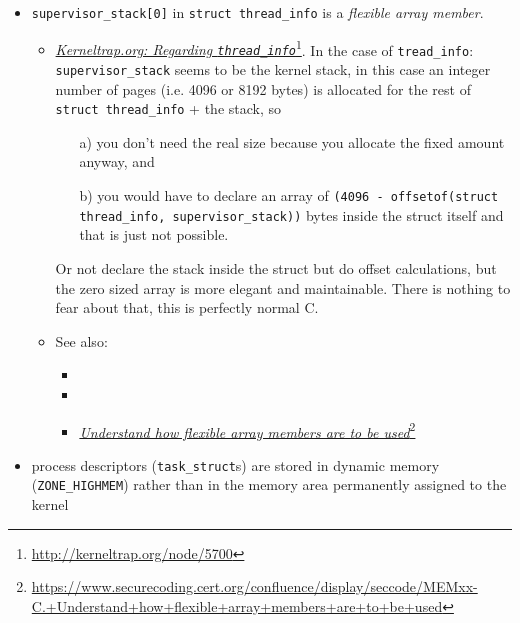 \begin{itemize}
\begin{description}
    kernel stack is either 4 or 8KB, and either way a 1.7KB is pretty much, so storing a
    slimmer struct, that points to \texttt{task\_struct}, immediately saves a lot of stack
    space and is a scalable solution.
  \end{description}
\item \texttt{supervisor\_stack[0]} in \texttt{struct thread\_info} is a \emph{flexible array
    member}.
  \begin{itemize}
  \item \href{http://kerneltrap.org/node/5700}{\emph{Kerneltrap.org: Regarding
      \texttt{thread\_info}}}\footnote{\url{http://kerneltrap.org/node/5700}}. In the case of \texttt{tread\_info}:
    \texttt{supervisor\_stack} seems to be the kernel stack, in this case an integer number
    of pages (i.e. 4096 or 8192 bytes) is allocated for the rest of \texttt{struct
      thread\_info} + the stack, so
    \begin{itemize}
    \item[a)] you don't need the real size because you allocate the fixed amount anyway,
      and
    \item[b)] you would have to declare an array of \texttt{(4096 - offsetof(struct
        thread\_info, supervisor\_stack))} bytes inside the struct itself and that is just
      not possible.
    \end{itemize}
    Or not declare the stack inside the struct but do offset calculations, but the zero
    sized array is more elegant and maintainable. There is nothing to fear about that,
    this is perfectly normal C.
  \item See also:
    \begin{itemize}
    \item {}
    \item {}
    \item \href{https://www.securecoding.cert.org/confluence/display/seccode/MEMxx-C.+Understand+how+flexible+array+members+are+to+be+used}{\emph{Understand how flexible array members are to be
      used}}\footnote{\url{https://www.securecoding.cert.org/confluence/display/seccode/MEMxx-C.+Understand+how+flexible+array+members+are+to+be+used}}
    \end{itemize}
  \end{itemize}
\item process descriptors (\texttt{task\_struct}s) are stored in dynamic memory
  (\texttt{ZONE\_HIGHMEM}) rather than in the memory area permanently assigned to the kernel

\end{itemize}
